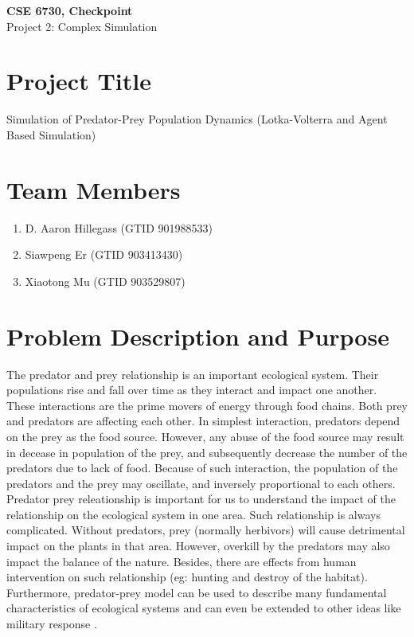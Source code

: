\documentclass{article}
\begin{document}
	\begin{center}
		
		\LARGE{\textbf{CSE 6730, Checkpoint}} \\
		\vspace{1em}
		\Large{Project 2: Complex Simulation} \\
		
	\end{center}
	\begin{normalsize}
		
		\section{Project Title}
		
		Simulation of Predator-Prey Population Dynamics (Lotka-Volterra and Agent Based Simulation)
		
		\section{Team Members}
		
		\begin{enumerate}
			\item D. Aaron Hillegass (GTID 901988533)
			\item Siawpeng Er (GTID 903413430)
			\item Xiaotong Mu (GTID 903529807)
		\end{enumerate}
		
		\section{Problem Description and Purpose}
		The predator and prey relationship is an important ecological system. Their populations rise and fall over time as they interact and impact one another. These interactions are the prime movers of energy through food chains. Both prey and predators are affecting each other. In simplest interaction, predators depend on the prey as the food source. However, any abuse of the food source may result in decease in population of the prey, and subsequently decrease the number of the predators due to lack of food. Because of such interaction, the population of the predators and the prey may oscillate, and inversely proportional to each others.  \\
		
		Predator prey releationship is important for us to understand the impact of the relationship on the ecological system in one area. Such relationship is always complicated. Without predators, prey (normally herbivors) will cause detrimental impact on the plants in that area. However, overkill by the predators may also impact the balance of the nature. Besides, there are effects from human intervention on such relationship (eg: hunting and destroy of the habitat). Furthermore, predator-prey model can be used to describe many fundamental characteristics of ecological systems and can even be extended to other ideas like military response \cite{derrik}.\\
		

\end{normalsize}
\end{document}
